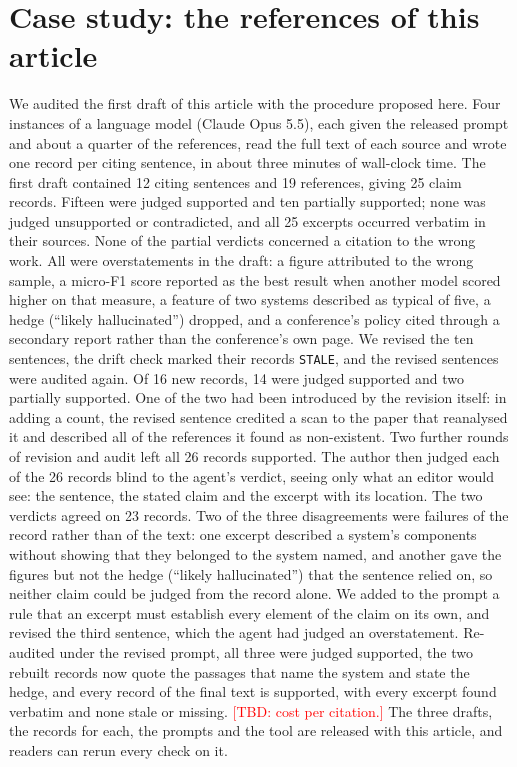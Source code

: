 \documentclass[11pt]{article}
\newcommand{\TBD}[1]{\textcolor{red}{[TBD: #1]}}
\begin{document}
\section{Case study: the references of this article}

We audited the first draft of this article with the procedure proposed here. Four instances of a language model (Claude Opus 5.5), each given the released prompt and about a quarter of the references, read the full text of each source and wrote one record per citing sentence, in about three minutes of wall-clock time. The first draft contained 12 citing sentences and 19 references, giving 25 claim records. Fifteen were judged supported and ten partially supported; none was judged unsupported or contradicted, and all 25 excerpts occurred verbatim in their sources. None of the partial verdicts concerned a citation to the wrong work. All were overstatements in the draft: a figure attributed to the wrong sample, a micro-F1 score reported as the best result when another model scored higher on that measure, a feature of two systems described as typical of five, a hedge (``likely hallucinated'') dropped, and a conference's policy cited through a secondary report rather than the conference's own page. We revised the ten sentences, the drift check marked their records \texttt{STALE}, and the revised sentences were audited again. Of 16 new records, 14 were judged supported and two partially supported. One of the two had been introduced by the revision itself: in adding a count, the revised sentence credited a scan to the paper that reanalysed it and described all of the references it found as non-existent. Two further rounds of revision and audit left all 26 records supported. The author then judged each of the 26 records blind to the agent's verdict, seeing only what an editor would see: the sentence, the stated claim and the excerpt with its location. The two verdicts agreed on 23 records. Two of the three disagreements were failures of the record rather than of the text: one excerpt described a system's components without showing that they belonged to the system named, and another gave the figures but not the hedge (``likely hallucinated'') that the sentence relied on, so neither claim could be judged from the record alone. We added to the prompt a rule that an excerpt must establish every element of the claim on its own, and revised the third sentence, which the agent had judged an overstatement. Re-audited under the revised prompt, all three were judged supported, the two rebuilt records now quote the passages that name the system and state the hedge, and every record of the final text is supported, with every excerpt found verbatim and none stale or missing. \TBD{cost per citation.} The three drafts, the records for each, the prompts and the tool are released with this article, and readers can rerun every check on it.
\end{document}
